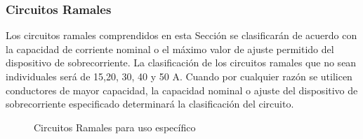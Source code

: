\documentclass[11pt,letterpaper]{article}
\begin{document}
\subsubsection{Circuitos Ramales}
Los circuitos ramales comprendidos en esta Sección se clasificarán de acuerdo con la capacidad de corriente nominal o el máximo valor de ajuste permitido del dispositivo de sobrecorriente. La clasificación de los circuitos ramales que no sean individuales será de 15,20, 30, 40 y 50 A. Cuando por cualquier razón se utilicen conducto­res de mayor capacidad, la capacidad nominal o ajuste del dispositivo de sobrecorriente especificado determinará la clasificación del circuito.

\begin{figure}[ht!]
	\centering
	\caption{Circuitos Ramales para uso específico}
\end{figure}
\end{document}
